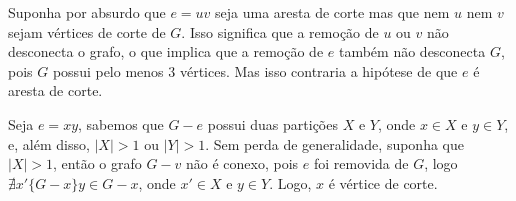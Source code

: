 

Suponha por absurdo que $e = uv$ seja uma aresta de corte mas que nem $u$ nem
$v$ sejam vértices de corte de $G$. Isso significa que a remoção de $u$ ou $v$
não desconecta o grafo, o que implica que a remoção de $e$ também não
desconecta $G$, pois $G$ possui pelo menos 3 vértices. Mas isso contraria a
hipótese de que $e$ é aresta de corte.


Seja $e = xy$, sabemos que $G- e$ possui duas partições $X$ e $Y$, onde 
$x \in X$ e $y \in Y$, e, além disso, $|X|>1$ ou $|Y|>1$. Sem perda de
generalidade, suponha que $|X|>1$, então o grafo $G-v$ não é conexo, pois
$e$ foi removida de $G$, logo $\nexists x'\{G-x\}y \in G-x$, onde $x'\in X$ 
e $y \in Y$. Logo, $x$ é vértice de corte.
\fimprova

